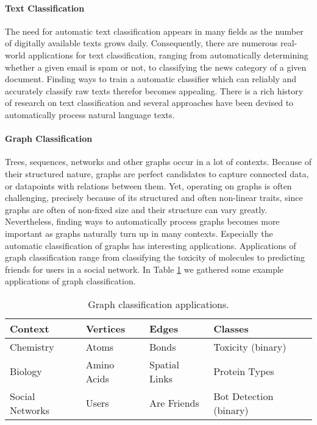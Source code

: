 
\paragraph{Text Classification}
The need for automatic text classification appears in many fields as the number of digitally available texts grows daily.
Consequently, there are numerous real-world applications for text classification, ranging from automatically determining whether a given email is spam or not, to classifying the news category of a given document.
Finding ways to train a automatic classifier which can reliably and accurately classify raw texts therefor becomes appealing.
There is a rich history of research on text classification and several approaches have been devised to automatically process natural language texts.

\paragraph{Graph Classification}
Trees, sequences, networks and other graphs occur in a lot of contexts.
Because of their structured nature, graphs are perfect candidates to capture connected data, or datapoints with relations between them.
Yet, operating on graphs is often challenging, precisely because of its structured and often non-linear traits, since graphs are often of non-fixed size and their structure can vary greatly.
Nevertheless, finding ways to automatically process graphs becomes more important as graphs naturally turn up in many contexts.
Especially the automatic classification of graphs has interesting applications.
Applications of graph classification range from classifying the toxicity of molecules to predicting friends for users in a social network.
In Table \ref{table:graph_classification_examples} we gathered some example applications of graph classification.

\begin{table}[htb!]
\centering
\renewcommand*{\arraystretch}{0.95}
\begin{tabular}{llll}
Context & Vertices & Edges & Classes \\
\midrule
Chemistry & Atoms & Bonds & Toxicity (binary) \\
Biology & Amino Acids & Spatial Links & Protein Types \\ 
Social Networks & Users & Are Friends & Bot Detection (binary) \\
\bottomrule
\end{tabular}%
\caption[Table: Graph Classification Applications]{Graph classification applications.}%
\label{table:graph_classification_examples}
\end{table}

